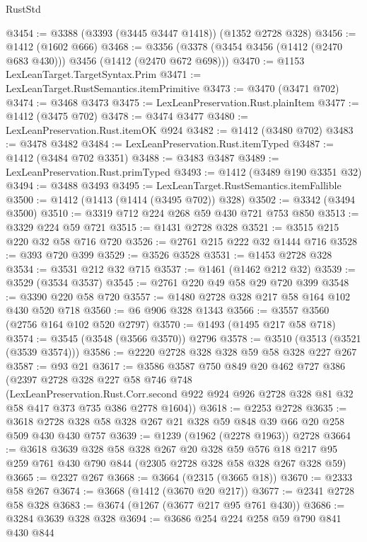 \begin{lexlean}{RustStd}
\begin{coremodule}
@3454 := @3388 (@3393 (@3445 @3447 @1418)) (@1352 @2728 @328)
@3456 := @1412 (@1602 @666)
@3468 := @3356 (@3378 (@3454 @3456 (@1412 (@2470 @683 @430))) @3456 (@1412 (@2470 @672 @698)))
@3470 := @1153 LexLeanTarget.TargetSyntax.Prim
@3471 := LexLeanTarget.RustSemantics.itemPrimitive
@3473 := @3470 (@3471 @702)
@3474 := @3468 @3473
@3475 := LexLeanPreservation.Rust.plainItem
@3477 := @1412 (@3475 @702)
@3478 := @3474 @3477
@3480 := LexLeanPreservation.Rust.itemOK @924
@3482 := @1412 (@3480 @702)
@3483 := @3478 @3482
@3484 := LexLeanPreservation.Rust.itemTyped
@3487 := @1412 (@3484 @702 @3351)
@3488 := @3483 @3487
@3489 := LexLeanPreservation.Rust.primTyped
@3493 := @1412 (@3489 @190 @3351 @32)
@3494 := @3488 @3493
@3495 := LexLeanTarget.RustSemantics.itemFallible
@3500 := @1412 (@1413 (@1414 (@3495 @702)) @328)
@3502 := @3342 (@3494 @3500)
@3510 := @3319 @712 @224 @268 @59 @430 @721 @753 @850
@3513 := @3329 @224 @59 @721
@3515 := @1431 @2728 @328
@3521 := @3515 @215 @220 @32 @58 @716 @720
@3526 := @2761 @215 @222 @32 @1444 @716
@3528 := @393 @720 @399
@3529 := @3526 @3528
@3531 := @1453 @2728 @328
@3534 := @3531 @212 @32 @715
@3537 := @1461 (@1462 @212 @32)
@3539 := @3529 (@3534 @3537)
@3545 := @2761 @220 @49 @58 @29 @720 @399
@3548 := @3390 @220 @58 @720
@3557 := @1480 @2728 @328 @217 @58 @164 @102 @430 @520 @718
@3560 := @6 @906 @328 @1343
@3566 := @3557 @3560 (@2756 @164 @102 @520 @2797)
@3570 := @1493 (@1495 @217 @58 @718)
@3574 := @3545 (@3548 (@3566 @3570)) @2796
@3578 := @3510 (@3513 (@3521 (@3539 @3574)))
@3586 := @2220 @2728 @328 @328 @59 @58 @328 @227 @267
@3587 := @93 @21
@3617 := @3586
    @3587
    @750
    @849
    @20
    @462
    @727
    @386
    (@2397
      @2728
      @328
      @227
      @58
      @746
      @748
      (LexLeanPreservation.Rust.Corr.second
        @922
        @924
        @926
        @2728
        @328
        @81
        @32
        @58
        @417
        @373
        @735
        @386
        @2778
        @1604))
@3618 := @2253 @2728
@3635 := @3618 @2728 @328 @58 @328 @267 @21 @328 @59 @848 @39 @66 @20 @258 @509 @430 @430 @757
@3639 := @1239 (@1962 (@2278 @1963)) @2728
@3664 := @3618
    @3639
    @328
    @58
    @328
    @267
    @20
    @328
    @59
    @576
    @18
    @217
    @95
    @259
    @761
    @430
    @790
    @844
    (@2305 @2728 @328 @58 @328 @267 @328 @59)
@3665 := @2327 @267
@3668 := @3664 (@2315 (@3665 @18))
@3670 := @2333 @58 @267
@3674 := @3668 (@1412 (@3670 @20 @217))
@3677 := @2341 @2728 @58 @328
@3683 := @3674 (@1267 (@3677 @217 @95 @761 @430))
@3686 := @3284 @3639 @328 @328
@3694 := @3686 @254 @224 @258 @59 @790 @841 @430 @844

\end{coremodule}
\end{lexlean}
